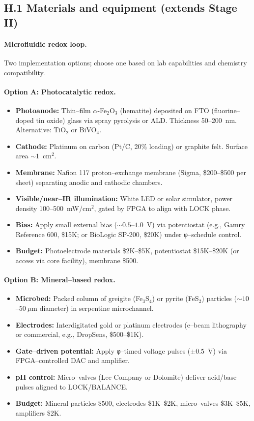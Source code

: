 \documentclass[11pt]{article}
\begin{document}
\subsection*{H.1 Materials and equipment (extends Stage II)}

\paragraph{Microfluidic redox loop.}
Two implementation options; choose one based on lab capabilities and chemistry compatibility.

\paragraph{Option A: Photocatalytic redox.}
\begin{itemize}
\item \textbf{Photoanode:} Thin–film $\alpha$-Fe$_2$O$_3$ (hematite) deposited on FTO (fluorine–doped tin oxide) glass via spray pyrolysis or ALD. Thickness 50–200~nm. Alternative: TiO$_2$ or BiVO$_4$.
\item \textbf{Cathode:} Platinum on carbon (Pt/C, 20\% loading) or graphite felt. Surface area $\sim 1$~cm$^2$.
\item \textbf{Membrane:} Nafion 117 proton–exchange membrane (Sigma, \$200–\$500 per sheet) separating anodic and cathodic chambers.
\item \textbf{Visible/near–IR illumination:} White LED or solar simulator, power density 100–500~mW/cm$^2$, gated by FPGA to align with \textsf{LOCK} phase.
\item \textbf{Bias:} Apply small external bias ($\sim 0.5$–$1.0$~V) via potentiostat (e.g., Gamry Reference 600, \$15K; or BioLogic SP-200, \$20K) under φ–schedule control.
\item \textbf{Budget:} Photoelectrode materials \$2K–\$5K, potentiostat \$15K–\$20K (or access via core facility), membrane \$500.
\end{itemize}

\paragraph{Option B: Mineral–based redox.}
\begin{itemize}
\item \textbf{Microbed:} Packed column of greigite (Fe$_3$S$_4$) or pyrite (FeS$_2$) particles ($\sim 10$–$50~\mu$m diameter) in serpentine microchannel.
\item \textbf{Electrodes:} Interdigitated gold or platinum electrodes (e–beam lithography or commercial, e.g., DropSens, \$500–\$1K).
\item \textbf{Gate–driven potential:} Apply φ–timed voltage pulses ($\pm 0.5$~V) via FPGA–controlled DAC and amplifier.
\item \textbf{pH control:} Micro–valves (Lee Company or Dolomite) deliver acid/base pulses aligned to \textsf{LOCK}/\textsf{BALANCE}.
\item \textbf{Budget:} Mineral particles \$500, electrodes \$1K–\$2K, micro–valves \$3K–\$5K, amplifiers \$2K.
\end{itemize}
\end{document}
